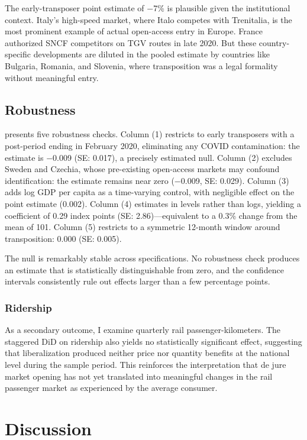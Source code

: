 \documentclass[12pt]{article}
\begin{document}
The early-transposer point estimate of $-$7\% is plausible given the institutional context. Italy's high-speed market, where Italo competes with Trenitalia, is the most prominent example of actual open-access entry in Europe. France authorized SNCF competitors on TGV routes in late 2020. But these country-specific developments are diluted in the pooled estimate by countries like Bulgaria, Romania, and Slovenia, where transposition was a legal formality without meaningful entry.

\subsection{Robustness}



 presents five robustness checks. Column (1) restricts to early transposers with a post-period ending in February 2020, eliminating any COVID contamination: the estimate is $-$0.009 (SE: 0.017), a precisely estimated null. Column (2) excludes Sweden and Czechia, whose pre-existing open-access markets may confound identification: the estimate remains near zero ($-$0.009, SE: 0.029). Column (3) adds log GDP per capita as a time-varying control, with negligible effect on the point estimate (0.002). Column (4) estimates in levels rather than logs, yielding a coefficient of 0.29 index points (SE: 2.86)---equivalent to a 0.3\% change from the mean of 101. Column (5) restricts to a symmetric 12-month window around transposition: 0.000 (SE: 0.005).

The null is remarkably stable across specifications. No robustness check produces an estimate that is statistically distinguishable from zero, and the confidence intervals consistently rule out effects larger than a few percentage points.

\subsubsection*{Ridership} As a secondary outcome, I examine quarterly rail passenger-kilometers. The staggered DiD on ridership also yields no statistically significant effect, suggesting that liberalization produced neither price nor quantity benefits at the national level during the sample period. This reinforces the interpretation that de jure market opening has not yet translated into meaningful changes in the rail passenger market as experienced by the average consumer.


\section{Discussion}
\end{document}
